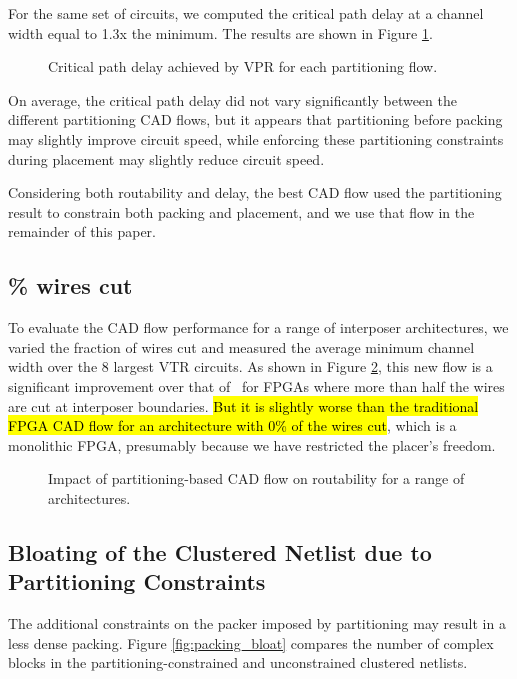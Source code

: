For the same set of circuits, we computed the critical path delay at a channel width equal to 1.3x the minimum. The results are shown in Figure \ref{fig:flows_crit_path}.

\begin{figure}[!htbp]
\centering

\caption{Critical path delay achieved by VPR for each partitioning flow.}
\label{fig:flows_crit_path}
\end{figure}

On average, the critical path delay did not vary significantly between the different partitioning CAD flows, but it appears that partitioning before packing may slightly improve circuit speed, while enforcing these partitioning constraints during placement may slightly reduce circuit speed.

Considering both routability and delay, the best CAD flow used the partitioning result to constrain both packing and placement, and we use that flow in the remainder of this paper.

\subsection{\% wires cut}
To evaluate the CAD flow performance for a range of interposer architectures, we varied the fraction of wires cut and measured the average minimum channel width over the 8 largest VTR circuits. As shown in Figure \ref{fig:wires_cut}, this new flow is a significant improvement over that of~\cite{interposer2014} for FPGAs where more than half the wires are cut at interposer boundaries. \hl{But it is slightly worse than the traditional FPGA CAD flow for an architecture with 0\% of the wires cut}, which is a monolithic FPGA, presumably because we have restricted the placer's freedom.

\begin{figure}[!htbp]
\centering

\caption{Impact of partitioning-based CAD flow on routability for a range of architectures.\protect\footnotemark}
\label{fig:wires_cut}
\end{figure}
\subsection{Bloating of the Clustered Netlist due to Partitioning Constraints}
The additional constraints on the packer imposed by partitioning may result in a less dense packing. Figure \ref{fig:packing_bloat} compares the number of complex blocks in the partitioning-constrained and unconstrained clustered netlists.

